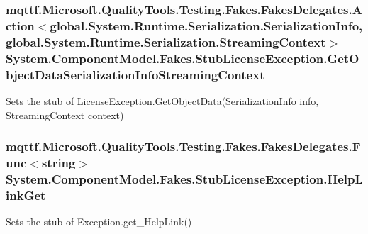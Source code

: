 \hypertarget{class_system_1_1_component_model_1_1_fakes_1_1_stub_license_exception_a95bf49f6cbe1fe3ed76bb5db992c5b52}{
\subsubsection[{Get\-Object\-Data\-Serialization\-Info\-Streaming\-Context}]{\setlength{\rightskip}{0pt plus 5cm}mqttf.\-Microsoft.\-Quality\-Tools.\-Testing.\-Fakes.\-Fakes\-Delegates.\-Action$<$global.\-System.\-Runtime.\-Serialization.\-Serialization\-Info, global.\-System.\-Runtime.\-Serialization.\-Streaming\-Context$>$ System.\-Component\-Model.\-Fakes.\-Stub\-License\-Exception.\-Get\-Object\-Data\-Serialization\-Info\-Streaming\-Context}}\label{class_system_1_1_component_model_1_1_fakes_1_1_stub_license_exception_a95bf49f6cbe1fe3ed76bb5db992c5b52}


Sets the stub of License\-Exception.\-Get\-Object\-Data(\-Serialization\-Info info, Streaming\-Context context)

\hypertarget{class_system_1_1_component_model_1_1_fakes_1_1_stub_license_exception_a77b48dafce0639ec965f0f05b62a17dd}{
\subsubsection[{Help\-Link\-Get}]{\setlength{\rightskip}{0pt plus 5cm}mqttf.\-Microsoft.\-Quality\-Tools.\-Testing.\-Fakes.\-Fakes\-Delegates.\-Func$<$string$>$ System.\-Component\-Model.\-Fakes.\-Stub\-License\-Exception.\-Help\-Link\-Get}}\label{class_system_1_1_component_model_1_1_fakes_1_1_stub_license_exception_a77b48dafce0639ec965f0f05b62a17dd}


Sets the stub of Exception.\-get\-\_\-\-Help\-Link()

